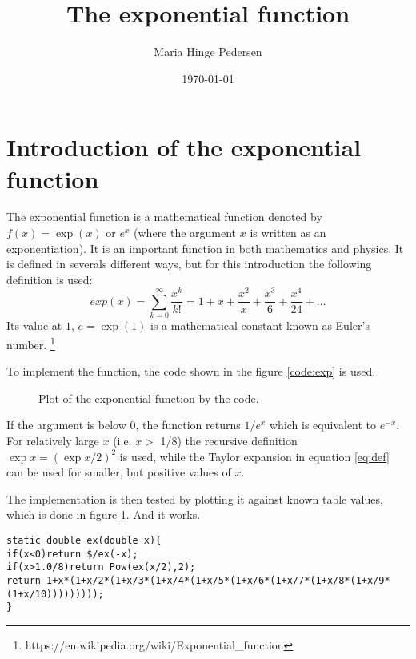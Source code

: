 \documentclass[a4paper,12pt]{article}
\begin{document}
\title{The exponential function}
\author{Maria Hinge Pedersen}
\date{\today}
\maketitle
\section{Introduction of the exponential function}
The exponential function is a mathematical function denoted by $f(x)=\exp(x)$ or $e^x$ (where the argument $x$ is written as an exponentiation).
It is an important function in both mathematics and physics.
It is defined in severals different ways, but for this introduction the following definition is used:
\begin{equation} \label{eq:def}
	exp(x) = \sum_{k=0}^{\infty} \frac{x^k}{k!}= 1+x+\frac{x^2}{x}+\frac{x^3}{6}+\frac{x^4}{24}+\ldots
\end{equation}
Its value at $1$, $e = \exp(1)$ is a mathematical constant known as Euler's number. \footnote{https://en.wikipedia.org/wiki/Exponential\_function} \

To implement the function, the code shown in the figure \ref{code:exp} is used.

\begin{figure} \label{fig:plot}
	\centering
		
	\caption{Plot of the exponential function by the code.}
\end{figure}

If the argument is below $0$, the function returns $1/e^x$ which is equivalent to $e^{-x}$.
For relatively large $x$ (i.e. $x>$ 1/8) the recursive definition $\exp{x}=(\exp{x/2})^2$ is used, while the Taylor expansion in equation \ref{eq:def} can be used for smaller, but positive values of $x$.

The implementation is then tested by plotting it against known table values, which is done in figure \ref{fig:plot}.
And it works.

\begin{lstlisting}[breaklines]
static double ex(double x){
if(x<0)return $/ex(-x);
if(x>1.0/8)return Pow(ex(x/2),2);
return 1+x*(1+x/2*(1+x/3*(1+x/4*(1+x/5*(1+x/6*(1+x/7*(1+x/8*(1+x/9*(1+x/10)))))))));
}
\end{lstlisting} \label{code:exp}
\end{document}
